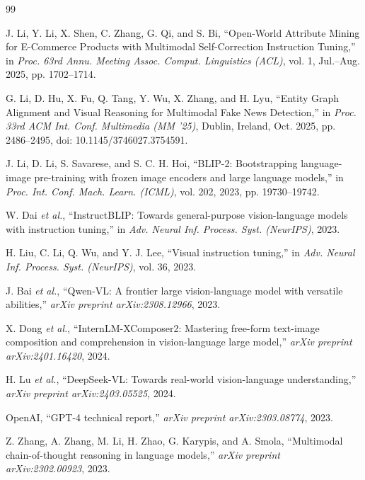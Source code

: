 \documentclass[conference,10pt]{IEEEtran}
\begin{document}
\begin{thebibliography}{99}

J. Li, Y. Li, X. Shen, C. Zhang, G. Qi, and S. Bi, ``Open-World Attribute Mining for E-Commerce Products with Multimodal Self-Correction Instruction Tuning,'' in \textit{Proc. 63rd Annu. Meeting Assoc. Comput. Linguistics (ACL)}, vol. 1, Jul.--Aug. 2025, pp. 1702--1714.

G. Li, D. Hu, X. Fu, Q. Tang, Y. Wu, X. Zhang, and H. Lyu, ``Entity Graph Alignment and Visual Reasoning for Multimodal Fake News Detection,'' in \textit{Proc. 33rd ACM Int. Conf. Multimedia (MM '25)}, Dublin, Ireland, Oct. 2025, pp. 2486--2495, doi: 10.1145/3746027.3754591.

J. Li, D. Li, S. Savarese, and S. C. H. Hoi, ``BLIP-2: Bootstrapping language-image pre-training with frozen image encoders and large language models,'' in \textit{Proc. Int. Conf. Mach. Learn. (ICML)}, vol. 202, 2023, pp. 19730--19742.

W. Dai \textit{et al.}, ``InstructBLIP: Towards general-purpose vision-language models with instruction tuning,'' in \textit{Adv. Neural Inf. Process. Syst. (NeurIPS)}, 2023.

H. Liu, C. Li, Q. Wu, and Y. J. Lee, ``Visual instruction tuning,'' in \textit{Adv. Neural Inf. Process. Syst. (NeurIPS)}, vol. 36, 2023.

J. Bai \textit{et al.}, ``Qwen-VL: A frontier large vision-language model with versatile abilities,'' \textit{arXiv preprint arXiv:2308.12966}, 2023.

X. Dong \textit{et al.}, ``InternLM-XComposer2: Mastering free-form text-image composition and comprehension in vision-language large model,'' \textit{arXiv preprint arXiv:2401.16420}, 2024.

H. Lu \textit{et al.}, ``DeepSeek-VL: Towards real-world vision-language understanding,'' \textit{arXiv preprint arXiv:2403.05525}, 2024.

OpenAI, ``GPT-4 technical report,'' \textit{arXiv preprint arXiv:2303.08774}, 2023.

Z. Zhang, A. Zhang, M. Li, H. Zhao, G. Karypis, and A. Smola, ``Multimodal chain-of-thought reasoning in language models,'' \textit{arXiv preprint arXiv:2302.00923}, 2023.


\end{thebibliography}
\end{document}
